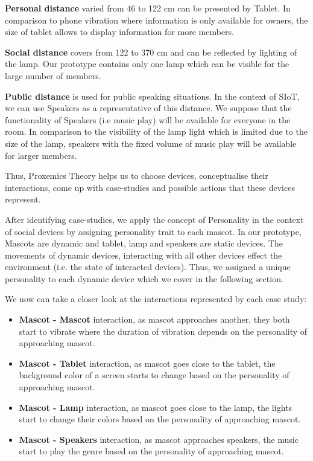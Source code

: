 \textbf{Personal distance} varied from 46 to 122 cm can be presented by Tablet. In comparison to phone vibration where information is only available for owners, the size of tablet allows to display information for more members.

\textbf{Social distance} covers from 122 to 370 cm and can be reflected by lighting of the lamp. Our prototype contains only one lamp which can be visible for the large number of members.

\textbf{Public distance} is used for public speaking situations. In the context of SIoT, we can use Speakers as a representative of this distance. We suppose that the functionality of Speakers (i.e music play) will be available for everyone in the room. In comparison to the visibility of the lamp light which is limited due to the size of the lamp, speakers with the fixed volume of music play will be available for larger members.

Thus, Proxemics Theory helps us to choose devices, conceptualise their interactions, come up with case-studies and possible actions that these devices represent. 

After identifying case-studies, we apply the concept of Personality in the context of social devices by assigning personality trait to each mascot. In our prototype, Mascots are dynamic and tablet, lamp and speakers are static devices. The movements of dynamic devices, interacting with all other devices effect the environment (i.e. the state of interacted devices). Thus, we assigned a unique personality to each dynamic device which we cover in the following section.

We now can take a closer look at the interactions represented by each case study:
\begin{itemize}
  \item \textbf{Mascot - Mascot} interaction, as mascot approaches another, they both start to vibrate where the duration of vibration depends on the personality of approaching mascot.
  \item \textbf{Mascot - Tablet} interaction, as mascot goes close to the tablet, the background color of a screen starts to change based on the personality of approaching mascot.
   \item \textbf{Mascot - Lamp} interaction, as mascot goes close to the lamp, the lights start to change their colors based on the personality of approaching mascot.
   \item \textbf{Mascot - Speakers} interaction, as mascot approaches speakers, the music start to play the genre based on the personality of approaching mascot.
\end{itemize}

